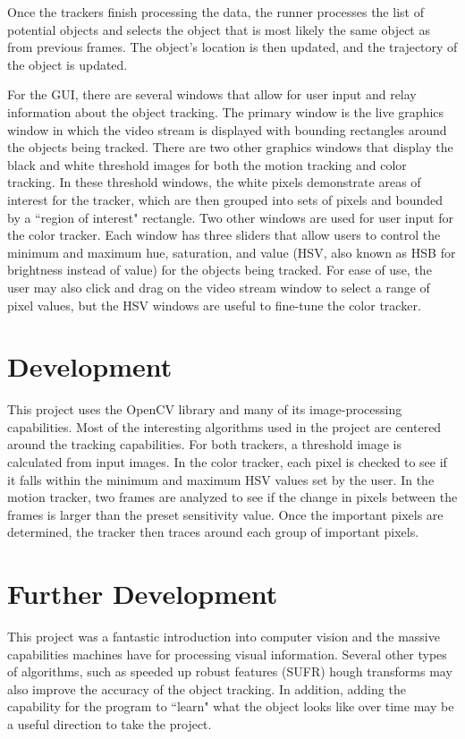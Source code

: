 \documentclass[11pt]{article}
\begin{document}
Once the trackers finish processing the data, the runner processes the list of potential objects and selects the object that is most likely the same object as from previous frames.  The object's location is then updated, and the trajectory of the object is updated.

For the GUI, there are several windows that allow for user input and relay information about the object tracking.  The primary window is the live graphics window in which the video stream is displayed with bounding rectangles around the objects being tracked.  There are two other graphics windows that display the black and white threshold images for both the motion tracking and color tracking.  In these threshold windows, the white pixels demonstrate areas of interest for the tracker, which are then grouped into sets of pixels and bounded by a ``region of interest" rectangle.  Two other windows are used for user input for the color tracker.  Each window has three sliders that allow users to control the minimum and maximum hue, saturation, and value (HSV, also known as HSB for brightness instead of value) for the objects being tracked.  For ease of use, the user may also click and drag on the video stream window to select a range of pixel values, but the HSV windows are useful to fine-tune the color tracker.

\section{Development}
This project uses the OpenCV library and many of its image-processing capabilities.  Most of the interesting algorithms used in the project are centered around the tracking capabilities.  For both trackers, a threshold image is calculated from input images.  In the color tracker, each pixel is checked to see if it falls within the minimum and maximum HSV values set by the user.  In the motion tracker, two frames are analyzed to see if the change in pixels between the frames is larger than the preset sensitivity value.  Once the important pixels are determined, the tracker then traces around each group of important pixels.

\section{Further Development}
This project was a fantastic introduction into computer vision and the massive capabilities machines have for processing visual information.  Several other types of algorithms, such as speeded up robust features (SUFR) hough transforms may also improve the accuracy of the object tracking.  In addition, adding the capability for the program to ``learn" what the object looks like over time may be a useful direction to take the project.
\end{document}
